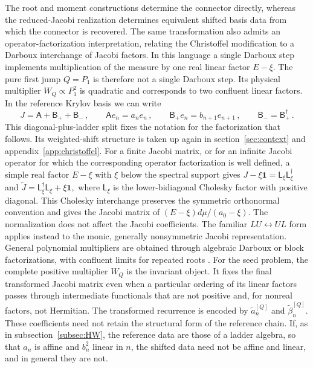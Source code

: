 \documentclass[a4paper,11pt]{article}
\def\dd{d}%
\def\Jac{J}%
\theoremstyle{definition}
\theoremstyle{remark}
\newcommand{\dd}{\mathrm d}
\newcommand{\Jac}{\mathsf J}
\newcommand{\Id}{\mathbf 1}
\begin{document}
The root and moment constructions determine the connector directly, whereas the reduced-Jacobi realization determines equivalent shifted basis data from which the connector is recovered. The same transformation also admits an operator-factorization interpretation, relating the Christoffel modification to a Darboux interchange of Jacobi factors.
In this language a single Darboux step implements multiplication of the measure by one real linear factor $E-\xi$. The pure first jump $Q=P_1$ is therefore not a single Darboux step. Its physical multiplier $W_Q\propto P_1^2$ is quadratic and corresponds to two confluent linear factors. In the reference Krylov basis we can write
\begin{equation}
   \Jac
   =
   \mathsf A+\mathsf B_++\mathsf B_-\,,
   \qquad
   \mathsf A e_n=a_ne_n\,,
   \qquad
   \mathsf B_+e_n=b_{n+1}e_{n+1}\,,
   \qquad
   \mathsf B_-=\mathsf B_+^\dagger\,.
   \label{eq:Jacobi-ladder-main}
\end{equation}
This diagonal-plus-ladder split fixes the notation for the factorization that follows. Its weighted-shift structure is taken up again in section~\ref{sec:context} and appendix~\ref{app:christoffel}. For a finite Jacobi matrix, or for an infinite Jacobi operator for which the corresponding operator factorization is well defined, a simple real factor $E-\xi$ with $\xi$ below the spectral support gives
$
   \Jac-\xi\Id=\mathsf L_\xi\mathsf L_\xi^\dagger
$
and
$
   \widetilde\Jac=\mathsf L_\xi^\dagger\mathsf L_\xi+\xi\Id,
$
where $\mathsf L_\xi$ is the lower-bidiagonal Cholesky factor with positive diagonal. This Cholesky interchange preserves the symmetric orthonormal convention and gives the Jacobi matrix of $(E-\xi)\dd\mu/(a_0-\xi)$. The normalization does not affect the Jacobi coefficients.
The familiar $LU\leftrightarrow UL$ form applies instead to the monic, generally nonsymmetric Jacobi representation. General polynomial multipliers are obtained through algebraic Darboux or block factorizations, with confluent limits for repeated roots \cite{BuenoMarcellan2004,GutlebOlverSlevinsky2024}. For the seed problem, the complete positive multiplier $W_Q$ is the invariant object. It fixes the final transformed Jacobi matrix even when a particular ordering of its linear factors passes through intermediate functionals that are not positive and, for nonreal factors, not Hermitian. The transformed recurrence is encoded by $\widetilde a_n^{[Q]}$ and $\widetilde\beta_n^{[Q]}$. These coefficients need not retain the structural form of the reference chain. If, as in subsection~\ref{subsec:HW}, the reference data are those of a ladder algebra, so that $a_n$ is affine and $b_n^2$ linear in $n$, the shifted data need not be affine and linear, and in general they are not.
\end{document}
